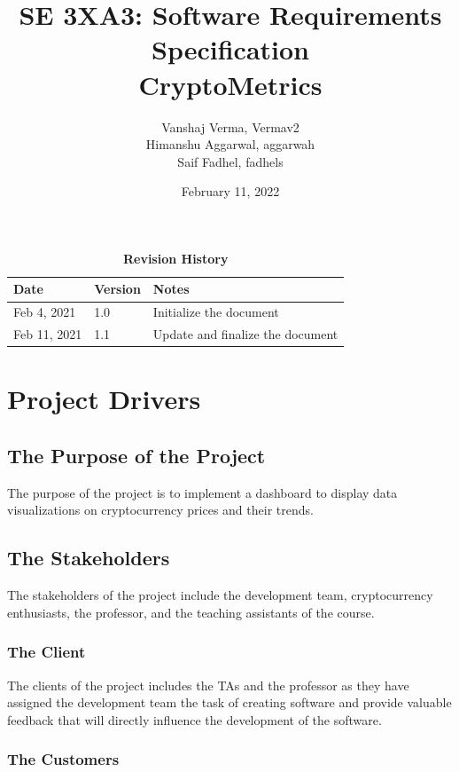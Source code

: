 \documentclass[12pt, titlepage]{article}
\title{SE 3XA3: Software Requirements Specification \\ CryptoMetrics}
\author{Vanshaj Verma, Vermav2
		\\ Himanshu Aggarwal, aggarwah
		\\ Saif Fadhel, fadhels
}
\date{February 11, 2022}
\begin{document}
\maketitle

\tableofcontents
\listoftables
\listoffigures

\begin{table}[bp]
\caption{\bf Revision History}
\begin{tabularx}{\textwidth}{p{3cm}p{2cm}X}
\toprule {\bf Date} & {\bf Version} & {\bf Notes}\\
\midrule
Feb 4, 2021 & 1.0 & Initialize the document \\
Feb 11, 2021 & 1.1 & Update and finalize the document \\
\bottomrule
\end{tabularx}
\end{table}

\newpage


\section{Project Drivers}

\subsection{The Purpose of the Project}
The purpose of the project is to implement a dashboard to display data visualizations on cryptocurrency prices and their trends.

\subsection{The Stakeholders}

The stakeholders of the project include the development team, cryptocurrency enthusiasts, the professor, and the teaching assistants of the course. 

\subsubsection{The Client}

The clients of the project includes the TAs and the professor as they have assigned the development team the task of creating software and provide valuable feedback that will directly influence the development of the software.

\subsubsection{The Customers}
\end{document}
